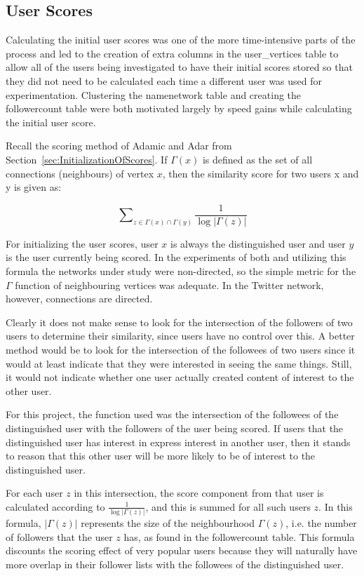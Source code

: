 \subsection{User Scores}

Calculating the initial user scores was one of the more time-intensive parts of the process and led to the creation of extra columns in the user\_vertices table to allow all of the users being investigated to have their initial scores stored so that they did not need to be calculated each time a different user was used for experimentation. Clustering the namenetwork table and creating the followercount table were both motivated largely by speed gains while calculating the initial user score.

Recall the scoring method of Adamic and Adar from Section~\ref{sec:InitializationOfScores}. If $\Gamma (x)$ is defined as the set of all connections (neighbours) of vertex $x$, then the similarity score for two users x and y is given as: 

\begin{center}
\[
\sum\nolimits_{z \in \Gamma (x) \cap \Gamma (y)} \frac{1}{\log |\Gamma (z) |}
\]
\end{center}

For initializing the user scores, user $x$ is always the distinguished user and user $y$ is the user currently being scored. In the experiments of both \cite{Adamic2003} and \cite{LibenNowell2007} utilizing this formula the networks under study were non-directed, so the simple metric for the $\Gamma$ function of neighbouring vertices was adequate. In the Twitter network, however, connections are directed.

Clearly it does not make sense to look for the intersection of the followers of two users to determine their similarity, since users have no control over this. A better method would be to look for the intersection of the followees of two users since it would at least indicate that they were interested in seeing the same things. Still, it would not indicate whether one user actually created content of interest to the other user.

For this project, the function used was the intersection of the followees of the distinguished user with the followers of the user being scored. If users that the distinguished user has interest in express interest in another user, then it stands to reason that this other user will be more likely to be of interest to the distinguished user.

For each user $z$ in this intersection, the score component from that user is calculated according to $\frac{1}{\log |\Gamma (z) |}$, and this is summed for all such users $z$. In this formula, $|\Gamma (z)|$ represents the size of the neighbourhood $\Gamma (z)$, i.e. the number of followers that the user $z$ has, as found in the followercount table. This formula discounts the scoring effect of very popular users because they will naturally have more overlap in their follower lists with the followees of the distinguished user.

